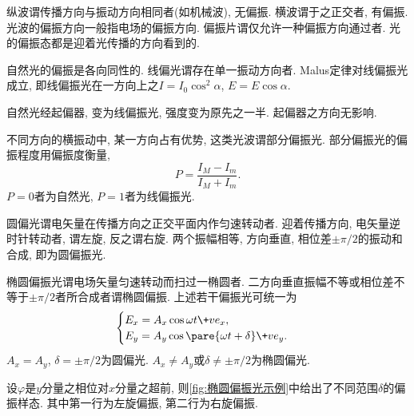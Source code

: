 \documentclass{ctexart}
\begin{document}
纵波谓传播方向与振动方向相同者(如机械波), 无偏振. 横波谓于之正交者, 有偏振. 光波的偏振方向一般指电场的偏振方向. 偏振片谓仅允许一种偏振方向通过者. {\color{red}光的偏振态都是迎着光传播的方向看到的.}
\par
自然光的偏振是各向同性的. 线偏光谓存在单一振动方向者. Malus定律对线偏振光成立, 即线偏振光在一方向上之$I = I_0\cos^2\alpha$, $E = E\cos\alpha$.
\par
自然光经起偏器, 变为线偏振光, 强度变为原先之一半. 起偏器之方向无影响.
\par
不同方向的横振动中, 某一方向占有优势, 这类光波谓部分偏振光. 部分偏振光的偏振程度用偏振度衡量,
\[ P = \frac{I_M - I_m}{I_M + I_m}. \]
$P=0$者为自然光, $P=1$者为线偏振光.
\par
圆偏光谓电矢量在传播方向之正交平面内作匀速转动者. 迎着传播方向, 电矢量逆时针转动者, 谓左旋, 反之谓右旋. 两个振幅相等, 方向垂直, 相位差$\pm \pi/2$的振动和合成, 即为圆偏振光. 
\par
椭圆偏振光谓电场矢量匀速转动而扫过一椭圆者. 二方向垂直振幅不等或相位差不等于$\pm\pi/2$者所合成者谓椭圆偏振. 上述若干偏振光可统一为
\[ \begin{cases}
    E_x = A_x \cos\omega t \+ve_x,\\
    E_y = A_y \cos\pare{\omega t + \delta}\+ve_y.
\end{cases} \]
$A_x=A_y$, $\delta = \pm\pi/2$为圆偏光. $A_x\neq A_y$或$\delta\neq \pm\pi/2$为椭圆偏光.
\par
设$\varphi$是$y$分量之相位对$x$分量之超前, 则\cref{fig:椭圆偏振光示例}中给出了不同范围$\delta$的偏振样态. 其中第一行为左旋偏振, 第二行为右旋偏振.
\end{document}
